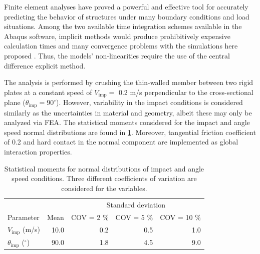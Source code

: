 \documentclass[12pt,number,preprint,review,times]{elsarticle}
\begin{document}
Finite element analyses have proved a powerful and effective tool for accurately predicting the behavior of structures under many boundary conditions and load situations. Among the two available time integration schemes available in the Abaqus software, implicit methods would produce prohibitively expensive calculation times and many convergence problems with the simulations here proposed \citep{belytschko1992computational}. Thus, the models' non-linearities require the use of the central difference explicit method.

The analysis is performed by crushing the thin-walled member between two rigid plates at a constant speed of $V_{\mathrm{imp}} =$ 0.2 m/s perpendicular to the cross-sectional plane ($\theta_{\mathrm{imp}} = 90^{\circ}$). However, variability in the impact conditions is considered similarly as the uncertainties in material and geometry, albeit these may only be analyzed via FEA. The statistical moments considered for the impact and angle speed normal distributions are found in \cref{tab:var_impact}. Moreover, tangential friction coefficient of 0.2 and hard contact in the normal component are implemented as global interaction properties.  


\begin{table}[!htpb]
\begin{center}
\small
\begin{tabular}[t]{lrrrr} \toprule
 &  &  \multicolumn{3}{c}{Standard deviation}  \\\cmidrule{3-5}
Parameter & Mean       &    COV = 2 \%  &  COV = 5 \%      &    COV = 10 \%  \\\midrule
$V_{\mathrm{imp}}$ (m/s)  &  10.0 &  0.2 & 0.5 & 1.0   \\
$\theta_{\mathrm{imp}}$ ($^{\circ}$) &  90.0 & 1.8 & 4.5 & 9.0 \\
\bottomrule
\end{tabular}
\captionsetup{justification=centering}
\caption{Statistical moments for normal distributions of impact and angle speed conditions. Three different coefficients of variation are considered for the variables.}
\label{tab:var_impact}
\end{center}
\end{table}


\end{document}
